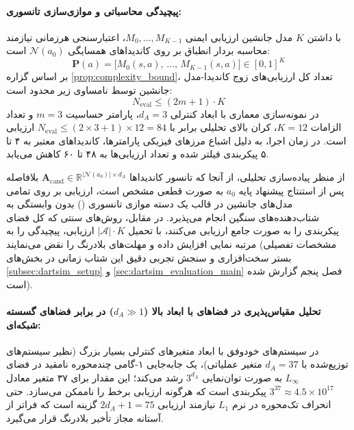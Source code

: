 \documentclass[oneside,openany,phd]{TMU-Thesis}
\begin{document}
\paragraph{پیچیدگی محاسباتی و موازی‌سازی تانسوری:}
با داشتن $K$ مدل جانشین ارزیابی ایمنی $M_0, \dots, M_{K-1}$، اعتبارسنجی هرزمانی نیازمند محاسبه بردار انطباق بر روی کاندیداهای همسایگی $\mathcal{N}(a_0)$ است:
\begin{equation}
\label{eq:compliance_vector}
\mathbf{P}(a) = \big[ M_0(s, a),\, \dots,\, M_{K-1}(s, a) \big] \in [0, 1]^K
\end{equation}
بر اساس گزاره \ref{prop:complexity_bound}، تعداد کل ارزیابی‌های زوج کاندیدا-مدل جانشین توسط نامساوی زیر محدود است:
\begin{equation}
\label{eq:tensor_eval_bound}
N_{\text{eval}} \le (2m + 1) \cdot K
\end{equation}
در نمونه‌سازی معماری با ابعاد کنترلی $d_A = 3$، پارامتر حساسیت $m = 3$ و تعداد الزامات $K = 12$، کران بالای تحلیلی برابر با $N_{\text{eval}} \le (2 \times 3 + 1) \times 12 = 84$ ارزیابی است. در زمان اجرا، به دلیل اشباع مرزهای فیزیکی پارامترها، کاندیداهای معتبر به ۴ تا ۵ پیکربندی فیلتر شده و تعداد ارزیابی‌ها به ۴۸ تا ۶۰ کاهش می‌یابد.

از منظر پیاده‌سازی تحلیلی، از آنجا که تانسور کاندیداها $\mathbf{A}_{\text{cand}} \in \mathbb{R}^{|\mathcal{N}(a_0)| \times d_A}$ بلافاصله پس از استنتاج پیشنهاد پایه $a_0$ به صورت قطعی مشخص است، ارزیابی بر روی تمامی مدل‌های جانشین در قالب یک دسته موازی تانسوری () بدون وابستگی به شتاب‌دهنده‌های سنگین انجام می‌پذیرد. در مقابل، روش‌های سنتی که کل فضای پیکربندی را به صورت جامع ارزیابی می‌کنند، با تحمیل $|\mathcal{A}| \cdot K$ ارزیابی، پیچیدگی را به مرتبه نمایی افزایش داده و مهلت‌های بلادرنگ را نقض می‌نمایند (مشخصات تفصیلی بستر سخت‌افزاری و سنجش تجربی دقیق این شتاب زمانی در بخش‌های \ref{subsec:dartsim_setup} و \ref{sec:dartsim_evaluation_main} فصل پنجم گزارش شده است).

\paragraph{تحلیل مقیاس‌پذیری در فضاهای با ابعاد بالا ($d_A \gg 1$) در برابر فضاهای گسسته شبکه‌ای:}
در سیستم‌های خودوفق با ابعاد متغیرهای کنترلی بسیار بزرگ (نظیر سیستم‌های توزیع‌شده با $d_A = 37$ متغیر عملیاتی)، یک جابه‌جایی ۱-گامی چندمحوره نامقید در فضای $L_\infty$ به صورت توان‌نمایی $3^{d_A}$ رشد می‌کند؛ این مقدار برای ۳۷ متغیر معادل $3^{37} \approx 4.5 \times 10^{17}$ پیکربندی است که هرگونه ارزیابی برخط را ناممکن می‌سازد. حتی انحراف تک‌محوره در نرم $L_1$ نیازمند ارزیابی $2d_A + 1 = 75$ گزینه است که فراتر از آستانه مجاز تأخیر بلادرنگ قرار می‌گیرد.
\end{document}
